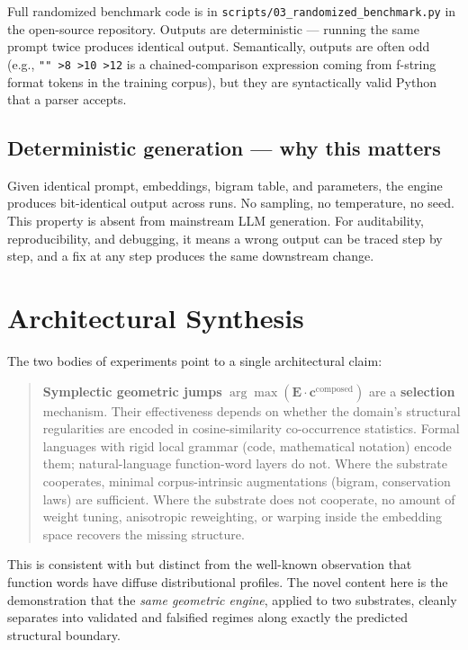 \documentclass[11pt,a4paper]{article}
\begin{document}
Full randomized benchmark code is in \texttt{scripts/03\_randomized\_benchmark.py} in the open-source repository. Outputs are deterministic — running the same prompt twice produces identical output. Semantically, outputs are often odd (e.g., \texttt{"" >8 >10 >12} is a chained-comparison expression coming from f-string format tokens in the training corpus), but they are syntactically valid Python that a parser accepts.

\subsection{Deterministic generation — why this matters}
Given identical prompt, embeddings, bigram table, and parameters, the engine produces bit-identical output across runs. No sampling, no temperature, no seed. This property is absent from mainstream LLM generation. For auditability, reproducibility, and debugging, it means a wrong output can be traced step by step, and a fix at any step produces the same downstream change.

\section{Architectural Synthesis}\label{sec:synthesis}

The two bodies of experiments point to a single architectural claim:

\begin{quote}
\textbf{Symplectic geometric jumps} $\arg\max(\mathbf{E} \cdot \mathbf{c}^{\text{composed}})$ are a \textbf{selection} mechanism. Their effectiveness depends on whether the domain's structural regularities are encoded in cosine-similarity co-occurrence statistics. Formal languages with rigid local grammar (code, mathematical notation) encode them; natural-language function-word layers do not. Where the substrate cooperates, minimal corpus-intrinsic augmentations (bigram, conservation laws) are sufficient. Where the substrate does not cooperate, no amount of weight tuning, anisotropic reweighting, or warping inside the embedding space recovers the missing structure.
\end{quote}

This is consistent with but distinct from the well-known observation that function words have diffuse distributional profiles. The novel content here is the demonstration that the \emph{same geometric engine}, applied to two substrates, cleanly separates into validated and falsified regimes along exactly the predicted structural boundary.
\end{document}
